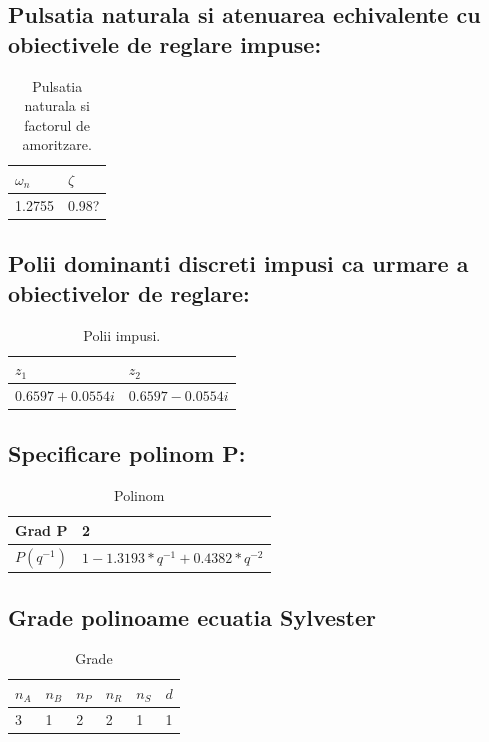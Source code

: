 \documentclass[12pt,english]{article}
\begin{document}
\subsection {Pulsatia naturala si atenuarea echivalente cu obiectivele de reglare impuse: }
\begin{table}[H]
  \centering
    \begin{tabular}{|l|l|}
      \hline
      $\omega_n$ & $\zeta$ \\
      \hline
      1.2755 & 0.98? \\
      \hline
    \end{tabular}
    \caption{Pulsatia naturala si factorul de amoritzare.}
\end{table}

\subsection {Polii dominanti discreti impusi ca urmare a obiectivelor de reglare: }
\begin{table}[H]
  \centering
    \begin{tabular}{|l|l|}
      \hline
      $z_1$ & $z_2$ \\
      \hline
      $0.6597 + 0.0554i$ & $0.6597 - 0.0554i$ \\
      \hline
    \end{tabular}
    \caption{Polii impusi.}
\end{table}

\subsection {Specificare polinom P: }
\begin{table}[H]
  \centering
    \begin{tabular}{|l|l|}
      \hline
      Grad P & 2 \\
      \hline
      $P(q^{-1})$ & $1 - 1.3193*q^{-1} + 0.4382*q^{-2}$ \\
      \hline
    \end{tabular}
    \caption{Polinom}
\end{table}

\subsection {Grade polinoame ecuatia Sylvester }
\begin{table}[H]
  \centering
    \begin{tabular}{|l|l|l|l|l|l|}
      \hline
      $n_A$ & $n_B$ & $n_P$ & $n_R$ & $n_S$ & $d$ \\
      \hline
      3 & 1 & 2 & 2 & 1 & 1 \\
      \hline
    \end{tabular}
    \caption{Grade}
\end{table}
\end{document}

